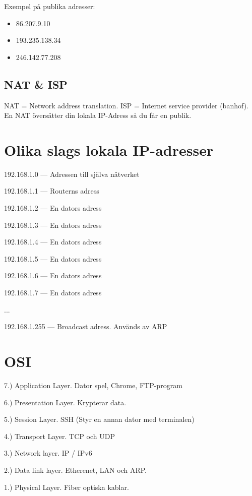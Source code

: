 \documentclass[fleqn]{article}
\begin{document}
Exempel på publika adresser:
\begin{itemize}
	\item 86.207.9.10
	\item 193.235.138.34
	\item 246.142.77.208
\end{itemize}

\subsection{NAT \& ISP}
NAT = Network address translation. ISP = Internet service provider (banhof). En NAT översätter din lokala IP-Adress så du får en publik.


\section{Olika slags lokala IP-adresser}
\begin{description}
	\item 192.168.1.0 --- Adressen till själva nätverket
	\item 192.168.1.1 --- Routerns adress
	\item 192.168.1.2 --- En dators adress
	\item 192.168.1.3 --- En dators adress
	\item 192.168.1.4 --- En dators adress
	\item 192.168.1.5 --- En dators adress
	\item 192.168.1.6 --- En dators adress
	\item 192.168.1.7 --- En dators adress
	\item ...
	\item 192.168.1.255 --- Broadcast adress. Används av ARP
\end{description}

\section{OSI}
\begin{description}
			
	\item 7.) Application Layer. Dator spel, Chrome, FTP-program
		      	      
	\item 6.) Presentation Layer. Krypterar data.
		      	      
	\item 5.) Session Layer. SSH (Styr en annan dator med terminalen)
		      	      
	\item 4.) Transport Layer. TCP och UDP
		      	      
	\item 3.) Network layer. IP / IPv6
		      	      
	\item 2.) Data link layer. Etherenet, LAN och ARP.
		      	      
	\item 1.) Physical Layer. Fiber optiska kablar.
\end{description}
\end{document}
